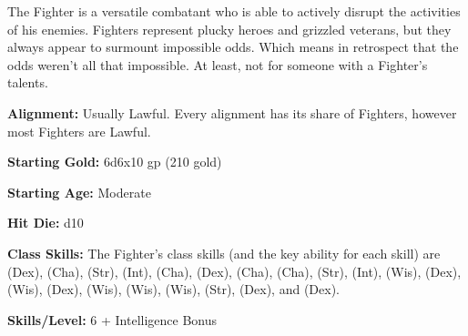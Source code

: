 
The Fighter is a versatile combatant who is able to actively disrupt the activities of his enemies. Fighters represent plucky heroes and grizzled veterans, but they always appear to surmount impossible odds. Which means in retrospect that the odds weren't all that impossible. At least, not for someone with a Fighter's talents.

\textbf{Alignment:} Usually Lawful. Every alignment has its share of Fighters, however most Fighters are Lawful.

\textbf{Starting Gold:} 6d6x10 gp (210 gold)

\textbf{Starting Age:} Moderate

\textbf{Hit Die:} d10

\textbf{Class Skills:} The Fighter's class skills (and the key ability for each skill) are  (Dex),  (Cha),  (Str),  (Int),  (Cha),  (Dex),  (Cha),  (Cha),  (Str),  (Int),  (Wis),  (Dex),  (Wis),  (Dex),  (Wis),  (Wis),  (Wis),  (Str),  (Dex), and  (Dex).

\textbf{Skills/Level:} 6 + Intelligence Bonus

\goodbab{}
\goodfor{}
\poorref{}
\poorwil{}

\begin{classtable}
\end{classtable}

\classfeatures

